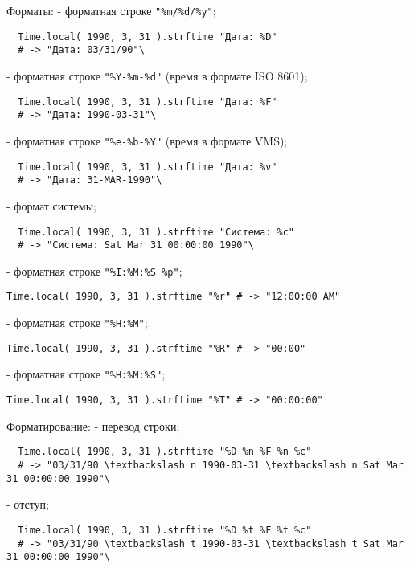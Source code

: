 \begin{keylist}{Форматы:}
   - форматная строке \verb!"%m/%d/%y"!;
  
  \begin{verbatim}
  Time.local( 1990, 3, 31 ).strftime "Дата: %D"
  # -> "Дата: 03/31/90"\
  \end{verbatim} 
     
   - форматная строке \verb!"%Y-%m-%d"! (время в формате ISO 8601); 
  \begin{verbatim}
  Time.local( 1990, 3, 31 ).strftime "Дата: %F"
  # -> "Дата: 1990-03-31"\
  \end{verbatim}   
   
   - форматная строке \verb!"%e-%b-%Y"! (время в формате VMS); 
  \begin{verbatim}
  Time.local( 1990, 3, 31 ).strftime "Дата: %v"
  # -> "Дата: 31-MAR-1990"\
  \end{verbatim}   
   
   - формат системы;
  \begin{verbatim}
  Time.local( 1990, 3, 31 ).strftime "Система: %c"
  # -> "Система: Sat Mar 31 00:00:00 1990"\
  \end{verbatim}
   
  \key{\%r} - форматная строке \verb!"%I:%M:%S %p"!; 
  
  \verb!Time.local( 1990, 3, 31 ).strftime "%r" # -> "12:00:00 AM"!    
   
  \key{\%R} - форматная строке \verb!"%H:%M"!; 
  
  \verb!Time.local( 1990, 3, 31 ).strftime "%R" # -> "00:00"!    
   
  \key{\%T} - форматная строке \verb!"%H:%M:%S"!; 
  
  \verb!Time.local( 1990, 3, 31 ).strftime "%T" # -> "00:00:00"!    
\end{keylist}

\begin{keylist}{Форматирование:}
  \firstkey{\%n} - перевод строки;
  \begin{verbatim}
  Time.local( 1990, 3, 31 ).strftime "%D %n %F %n %c"
  # -> "03/31/90 \textbackslash n 1990-03-31 \textbackslash n Sat Mar 31 00:00:00 1990"\
  \end{verbatim}    
   
  \key{\%t} - отступ;
  \begin{verbatim}
  Time.local( 1990, 3, 31 ).strftime "%D %t %F %t %c"
  # -> "03/31/90 \textbackslash t 1990-03-31 \textbackslash t Sat Mar 31 00:00:00 1990"\
  \end{verbatim}   
\end{keylist}

